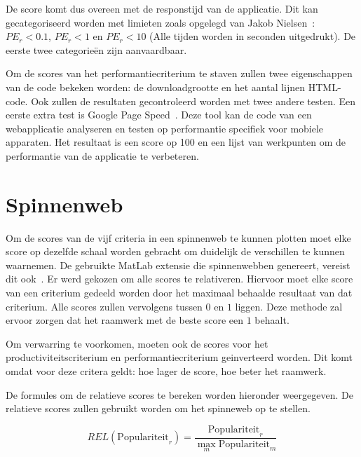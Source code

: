 De score komt dus overeen met de responstijd van de applicatie.
Dit kan gecategoriseerd worden met limieten zoals opgelegd van Jakob Nielsen~\cite{Nielsen1993}:  $PE_r < 0.1$,  $PE_r < 1$ en $PE_r < 10$ (Alle tijden worden in seconden uitgedrukt).
De eerste twee categorieën zijn aanvaardbaar.

Om de scores van het performantiecriterium te staven zullen twee eigenschappen van de code bekeken worden:  de downloadgrootte en het aantal lijnen HTML-code.
Ook zullen de resultaten gecontroleerd worden met twee andere testen.
Een eerste extra test is Google Page Speed~\cite{Morgan2011}. 
Deze tool kan de code van een webapplicatie analyseren en testen op performantie specifiek voor mobiele apparaten.
Het resultaat is een score op 100 en een lijst van werkpunten om de performantie van de applicatie te verbeteren.


\section{Spinnenweb}
\label{sec:vergelijking-spinnenweb}

Om de scores van de vijf criteria in een spinnenweb te kunnen plotten moet elke score op dezelfde schaal worden gebracht om duidelijk de verschillen te kunnen waarnemen.
De gebruikte MatLab extensie die spinnenwebben genereert, vereist dit ook~\cite{Martti2007}.
Er werd gekozen om alle scores te relativeren.
Hiervoor moet elke score van een criterium gedeeld worden door het maximaal behaalde resultaat van dat criterium.
Alle scores zullen vervolgens tussen $0$ en $1$ liggen.
Deze methode zal ervoor zorgen dat het raamwerk met de beste score een $1$ behaalt.

Om verwarring te voorkomen, moeten ook de scores voor het productiviteitscriterium en performantiecriterium geinverteerd worden.
Dit komt omdat voor deze critera geldt:  hoe lager de score,  hoe beter het raamwerk.

De formules om de relatieve scores te bereken worden hieronder weergegeven.
De relatieve scores zullen gebruikt worden om het spinneweb op te stellen.

\begin{equation}
  REL(\text{Populariteit}_r)=\frac{\text{Populariteit}_r}{\max_{m}{\text{Populariteit}_m}}
  \label{eq:rel-populariteit}
\end{equation}

